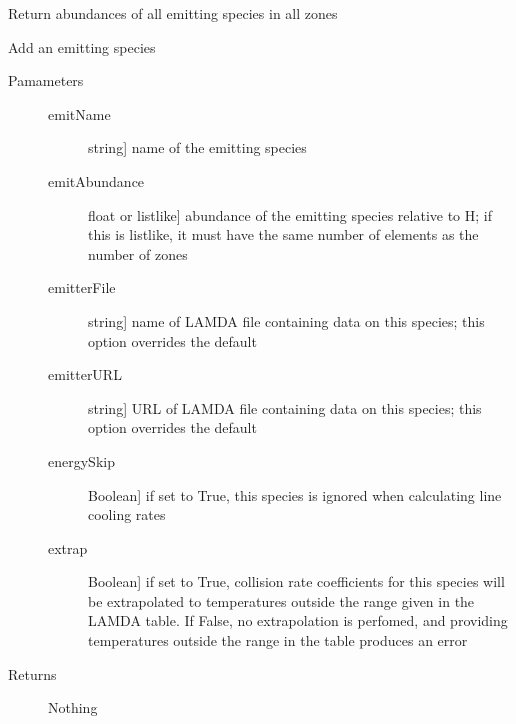 \documentclass[letterpaper,10pt,english]{sphinxmanual}
\begin{document}
\begin{fulllineitems}
\begin{fulllineitems}
\label{fulldoc:despotic.zonedcloud.abundances_zone}
Return abundances of all emitting species in all zones

\end{fulllineitems}


\begin{fulllineitems}
\label{fulldoc:despotic.zonedcloud.addEmitter}
Add an emitting species
\begin{description}
\item[{Pamameters}] \leavevmode\begin{description}
\item[{emitName}] \leavevmode{[}string{]}
name of the emitting species

\item[{emitAbundance}] \leavevmode{[}float or listlike{]}
abundance of the emitting species relative to H; if this
is listlike, it must have the same number of elements as
the number of zones

\item[{emitterFile}] \leavevmode{[}string{]}
name of LAMDA file containing data on this species; this
option overrides the default

\item[{emitterURL}] \leavevmode{[}string{]}
URL of LAMDA file containing data on this species; this
option overrides the default

\item[{energySkip}] \leavevmode{[}Boolean{]}
if set to True, this species is ignored when calculating
line cooling rates

\item[{extrap}] \leavevmode{[}Boolean{]}
if set to True, collision rate coefficients for this species
will be extrapolated to temperatures outside the range given
in the LAMDA table. If False, no extrapolation is perfomed,
and providing temperatures outside the range in the table
produces an error

\end{description}

\item[{Returns}] \leavevmode
Nothing


\end{description}
\end{fulllineitems}
\end{fulllineitems}
\end{document}
